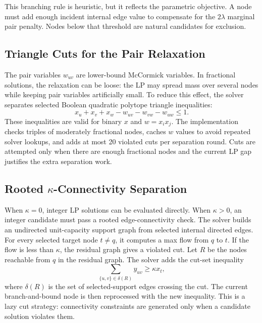 \documentclass[11pt]{article}
\begin{document}
This branching rule is heuristic, but it reflects the parametric objective. A
node must add enough incident internal edge value to compensate for the
$2\lambda$ marginal pair penalty. Nodes below that threshold are natural
candidates for exclusion.

\subsection{Triangle Cuts for the Pair Relaxation}

The pair variables $w_{uv}$ are lower-bound McCormick variables. In fractional
solutions, the relaxation can be loose: the LP may spread mass over several
nodes while keeping pair variables artificially small. To reduce this effect,
the solver separates selected Boolean quadratic polytope triangle inequalities:
\begin{equation}
  x_u+x_v+x_w-w_{uv}-w_{vw}-w_{uw}\leq 1.
  \label{eq:triangle}
\end{equation}
These inequalities are valid for binary $x$ and $w=x_ix_j$. The implementation
checks triples of moderately fractional nodes, caches $w$ values to avoid
repeated solver lookups, and adds at most 20 violated cuts per separation round.
Cuts are attempted only when there are enough fractional nodes and the current
LP gap justifies the extra separation work.

\subsection{Rooted \texorpdfstring{$\kappa$}{kappa}-Connectivity Separation}

When $\kappa=0$, integer LP solutions can be evaluated directly. When
$\kappa>0$, an integer candidate must pass a rooted edge-connectivity check. The
solver builds an undirected unit-capacity support graph from selected internal
directed edges. For every selected target node $t\neq q$, it computes a max flow
from $q$ to $t$. If the flow is less than $\kappa$, the residual graph gives a
violated cut. Let $R$ be the nodes reachable from $q$ in the residual graph.
The solver adds the cut-set inequality
\begin{equation}
  \sum_{\{u,v\}\in\delta(R)} y_{uv} \geq \kappa x_t,
  \label{eq:kappa-cut}
\end{equation}
where $\delta(R)$ is the set of selected-support edges crossing the cut. The
current branch-and-bound node is then reprocessed with the new inequality. This
is a lazy cut strategy: connectivity constraints are generated only when a
candidate solution violates them.
\end{document}

